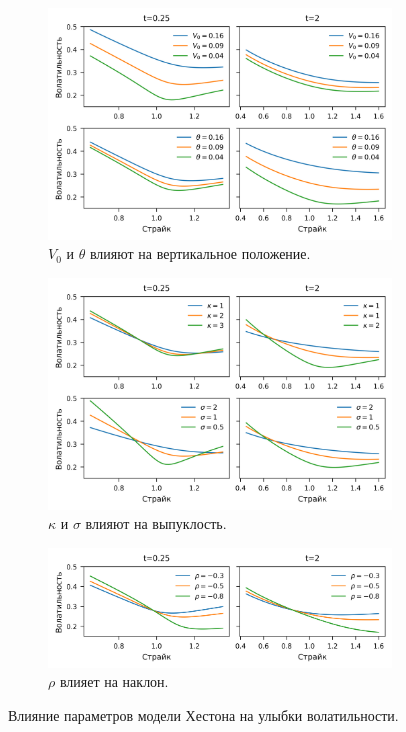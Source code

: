 \begin{figure}[h!]
\centering
  \begin{subfigure}{\textwidth}
    \centering
    \includegraphics{pic/heston-v0-theta.png}
    \caption{$V_0$ и $\theta$ влияют на вертикальное положение.}
    \label{hes:f:v0-theta}
  \end{subfigure}
  \begin{subfigure}{\textwidth}
    \centering
    \includegraphics{pic/heston-kappa-sigma.png}
    \caption{$\kappa$ и $\sigma$ влияют на выпуклость.}
    \label{hes:f:kappa-sigma}
  \end{subfigure}
  \begin{subfigure}{\textwidth}
    \centering
    \includegraphics{pic/heston-rho.png}
    \caption{$\rho$ влияет на наклон.}
    \label{hes:f:rho}
  \end{subfigure}
\caption{Влияние параметров модели Хестона на улыбки волатильности.}
\label{hes:f:smiles}
\end{figure}


